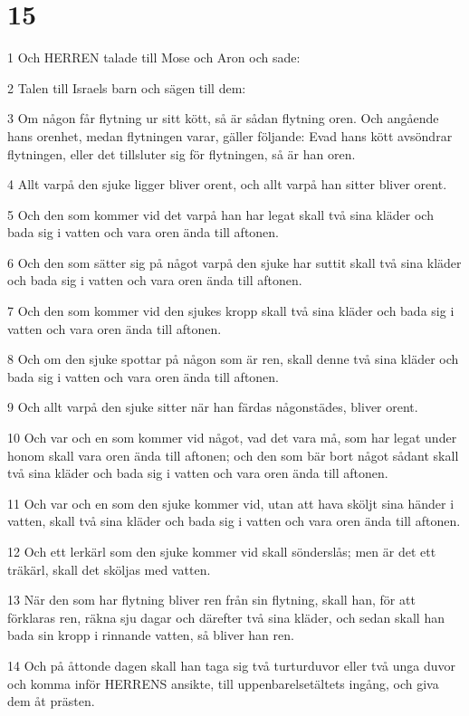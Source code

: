 \chapter{15}

\par 1 Och HERREN talade till Mose och Aron och sade:
\par 2 Talen till Israels barn och sägen till dem:
\par 3 Om någon får flytning ur sitt kött, så är sådan flytning oren. Och angående hans orenhet, medan flytningen varar, gäller följande: Evad hans kött avsöndrar flytningen, eller det tillsluter sig för flytningen, så är han oren.
\par 4 Allt varpå den sjuke ligger bliver orent, och allt varpå han sitter bliver orent.
\par 5 Och den som kommer vid det varpå han har legat skall två sina kläder och bada sig i vatten och vara oren ända till aftonen.
\par 6 Och den som sätter sig på något varpå den sjuke har suttit skall två sina kläder och bada sig i vatten och vara oren ända till aftonen.
\par 7 Och den som kommer vid den sjukes kropp skall två sina kläder och bada sig i vatten och vara oren ända till aftonen.
\par 8 Och om den sjuke spottar på någon som är ren, skall denne två sina kläder och bada sig i vatten och vara oren ända till aftonen.
\par 9 Och allt varpå den sjuke sitter när han färdas någonstädes, bliver orent.
\par 10 Och var och en som kommer vid något, vad det vara må, som har legat under honom skall vara oren ända till aftonen; och den som bär bort något sådant skall två sina kläder och bada sig i vatten och vara oren ända till aftonen.
\par 11 Och var och en som den sjuke kommer vid, utan att hava sköljt sina händer i vatten, skall två sina kläder och bada sig i vatten och vara oren ända till aftonen.
\par 12 Och ett lerkärl som den sjuke kommer vid skall sönderslås; men är det ett träkärl, skall det sköljas med vatten.
\par 13 När den som har flytning bliver ren från sin flytning, skall han, för att förklaras ren, räkna sju dagar och därefter två sina kläder, och sedan skall han bada sin kropp i rinnande vatten, så bliver han ren.
\par 14 Och på åttonde dagen skall han taga sig två turturduvor eller två unga duvor och komma inför HERRENS ansikte, till uppenbarelsetältets ingång, och giva dem åt prästen.
